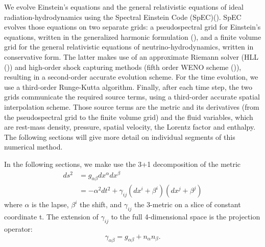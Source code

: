 We evolve Einstein's equations and the general relativistic equations of ideal radiation-hydrodynamics using the Spectral Einstein Code (SpEC)(\cite{specwebsite}). SpEC evolves those equations on
two separate grids: a pseudospectral grid for Einstein's equations, written in the generalized harmonic formulation (\cite{lindblom2006}),
and a finite volume grid for the general relativistic equations
of neutrino-hydrodynamics, written in conservative form. The latter
makes use of an approximate Riemann solver (HLL (\cite{hll}))
and high-order shock capturing methods (fifth order WENO
scheme (\cite{liu1994200,jiang1996202})), resulting in a second-order accurate evolution scheme. For the time evolution, we use a third-order
Runge-Kutta algorithm. Finally, after each time step, the two
grids communicate the required source terms, using a third-order accurate spatial interpolation scheme. Those source terms are the metric and its derivatives (from the pseudospectral grid to the finite volume grid) and the fluid variables, which are rest-mass density, pressure, spatial velocity, the Lorentz factor and enthalpy. The following sections will give more detail on individual segments of this numerical method.

In the following sections, we make use the 3+1 decomposition of the metric
%
\begin{align}
  ds^2 &= g_{\alpha\beta}dx^\alpha dx^\beta \\
  &= -\alpha^2dt^2 + \gamma_{ij}(dx^i + \beta^i)(dx^j + \beta^j)
\end{align}
%
where $\alpha$ is the lapse, $\beta^i$ the shift, and $\gamma_{ij}$ the 3-metric on a slice of constant coordinate t. The extension of $\gamma_{ij}$ to the full 4-dimensional space is the projection operator:
%
\begin{equation}
  \gamma_{\alpha\beta} = g_{\alpha\beta} + n_\alpha n_\beta.
\end{equation}
%



